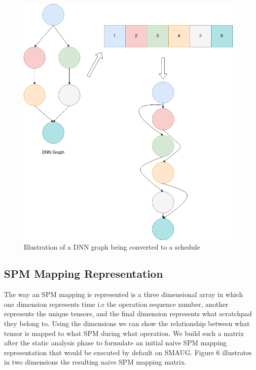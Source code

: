

\begin{figure}[th]
\centering
\includegraphics[scale=0.6]{Figures/graph_to_schedule.png}
\decoRule
\caption[Saved]{Illustration of a DNN graph being converted to a schedule}
\label{fig:Saved}
\end{figure}



\subsection{SPM Mapping Representation}

The way an SPM mapping is represented is a three dimensional array in which one
dimension represents time i.e the operation sequence number, another represents
the unique tensors, and the final dimension represents what scratchpad they
belong to. Using the dimensions we can show the relationship between what tensor
is mapped to what SPM during what operation. We build such a matrix after the
static analysis phase to formulate an initial naive SPM mapping representation
that would be executed by default on SMAUG. Figure 6 %
illustrates in two dimensions the resulting naive SPM mapping matrix.

